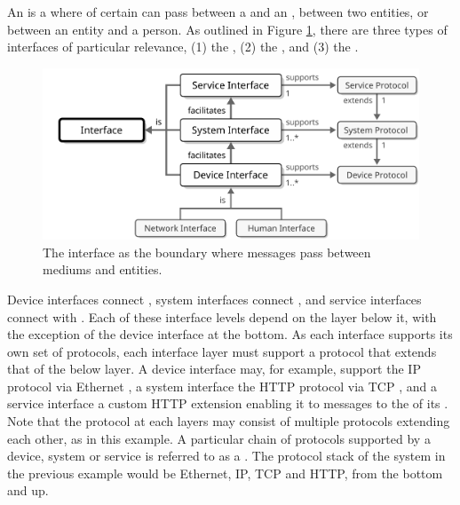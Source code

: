 An  is a  where  of certain  can pass between a  and an , between two entities, or between an entity and a person.
As outlined in Figure \ref{fig:interface}, there are three types of interfaces of particular relevance, (1) the , (2) the , and (3) the .

\begin{figure}[ht!]
  \centering
  \includegraphics[scale=0.9]{figures/interface}
  \caption{
    The interface as the boundary where messages pass between mediums and entities.
  }
  \label{fig:interface}
\end{figure}

Device interfaces connect , system interfaces connect , and service interfaces connect  with .
Each of these interface levels depend on the layer below it, with the exception of the device interface at the bottom.
As each interface supports its own set of protocols, each interface layer must support a protocol that extends that of the below layer.
A device interface may, for example, support the IP \cite{deering2017internet} protocol via Ethernet \cite{iso202188023}, a system interface the HTTP \cite{fielding2014hypertext} protocol via TCP \cite{postel1981transmission}, and a service interface a custom HTTP extension enabling it to  messages to the  of its .
Note that the protocol at each layers may consist of multiple protocols extending each other, as in this example.
A particular chain of protocols supported by a device, system or service is referred to as a .
The protocol stack of the system in the previous example would be Ethernet, IP, TCP and HTTP, from the bottom and up.

